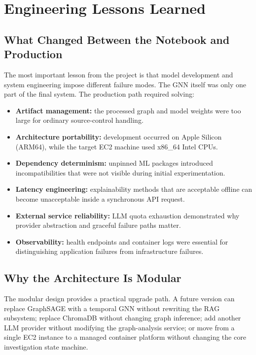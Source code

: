 \documentclass[11pt,a4paper]{report}
\begin{document}
\chapter{Engineering Lessons Learned}

\section{What Changed Between the Notebook and Production}

The most important lesson from the project is that model development and system engineering impose different failure modes. The GNN itself was only one part of the final system. The production path required solving:

\begin{itemize}[leftmargin=1.5em]
  \item \textbf{Artifact management:} the processed graph and model weights were too large for ordinary source-control handling.
  \item \textbf{Architecture portability:} development occurred on Apple Silicon (ARM64), while the target EC2 machine used x86\_64 Intel CPUs.
  \item \textbf{Dependency determinism:} unpinned ML packages introduced incompatibilities that were not visible during initial experimentation.
  \item \textbf{Latency engineering:} explainability methods that are acceptable offline can become unacceptable inside a synchronous API request.
  \item \textbf{External service reliability:} LLM quota exhaustion demonstrated why provider abstraction and graceful failure paths matter.
  \item \textbf{Observability:} health endpoints and container logs were essential for distinguishing application failures from infrastructure failures.
\end{itemize}

\section{Why the Architecture Is Modular}

The modular design provides a practical upgrade path. A future version can replace GraphSAGE with a temporal GNN without rewriting the RAG subsystem; replace ChromaDB without changing graph inference; add another LLM provider without modifying the graph-analysis service; or move from a single EC2 instance to a managed container platform without changing the core investigation state machine.
\end{document}
